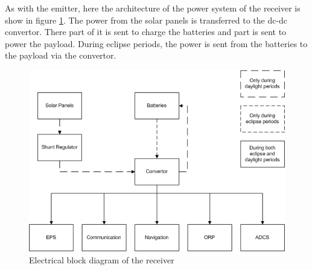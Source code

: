 As with the emitter, here the architecture of the power system of the receiver is show in figure \ref{fig:receiver_block}. The power from the solar panels is transferred to the dc-dc convertor. There part of it is sent to charge the batteries and part is sent to power the payload. During eclipse periods, the power is sent from the batteries to the payload via the convertor.

\begin{figure}[H!]
\centering
\includegraphics{chapters/img/EPS receiver block diagram.png}
\caption{Electrical block diagram of the receiver}
\label{fig:receiver_block}
\end{figure}